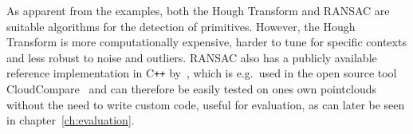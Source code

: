 As apparent from the examples, both the Hough Transform and RANSAC are suitable algorithms for the detection of primitives.
However, the Hough Transform is more computationally expensive, harder to tune for specific contexts and less robust to noise and outliers.
RANSAC also has a publicly available reference implementation in C\texttt{++} by~\parencite{schnabel_efficient_2007},
which is e.g.\ used in the open source tool CloudCompare~\parencite{daniel_girardeau-montaut_cloudcompare_nodate} and can therefore be
easily tested on ones own pointclouds without the need to write custom code, useful for evaluation, as can later be seen in chapter~\ref{ch:evaluation}.
